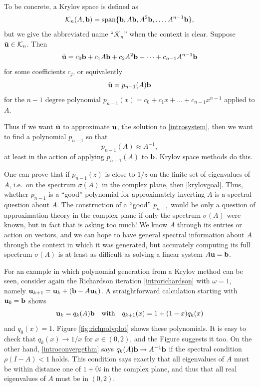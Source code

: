 To be concrete, a Krylov space is defined as
    $$\mathcal{K}_n(A,\mathbf{b}) = \operatorname{span}\{\mathbf{b},A\mathbf{b},A^2\mathbf{b},\dots,A^{n-1}\mathbf{b}\},$$
but we give the abbreviated name ``$\mathcal{K}_n$'' when the context is clear.  Suppose $\tilde{\mathbf{u}} \in \mathcal{K}_n$.  Then
    $$\tilde{\mathbf{u}} = c_0 \mathbf{b} + c_1 A \mathbf{b} + c_2 A^2 \mathbf{b} + \dots + c_{n-1} A^{n-1} \mathbf{b}$$
for some coefficients $c_j$, or equivalently
    $$\tilde{\mathbf{u}} = p_{n-1}(A) \mathbf{b}$$
for the $n-1$ degree polynomial $p_{n-1}(x) = c_0 + c_1 x + \dots + c_{n-1} x^{n-1}$ applied to $A$.

Thus if we want $\tilde{\mathbf{u}}$ to approximate $\mathbf{u}$, the solution to \eqref{introsystem}, then we want to find a polynomial $p_{n-1}$ so that
\begin{equation}
    p_{n-1}(A) \approx A^{-1},  \label{krylovgoal}
\end{equation}
at least in the action of applying $p_{n-1}(A)$ to $\mathbf{b}$.  Krylov space methods do this.

One can prove that if $p_{n-1}(z)$ is close to $1/z$ on the finite set of eigenvalues of $A$, i.e.~on the spectrum $\sigma(A)$ in the complex plane, then \eqref{krylovgoal}.  Thus, whether $p_{n-1}$ is a ``good'' polynomial for approximately inverting $A$ is a spectral question about $A$.  The construction of a ``good'' $p_{n-1}$ would be only a question of approximation theory in the complex plane if only the spectrum $\sigma(A)$ were known, but in fact that is asking too much!  We know $A$ through its entries or action on vectors, and we can hope to have general spectral information about $A$ through the context in which it was generated, but accurately computing its full spectrum $\sigma(A)$ is at least as difficult as solving a linear system $A\mathbf{u}=\mathbf{b}$.

For an example in which polynomial generation from a Krylov method can be seen, consider again the Richardson iteration \eqref{introrichardson} with $\omega=1$, namely $\mathbf{u}_{k+1} = \mathbf{u}_k + (\mathbf{b} - A \mathbf{u}_k)$.  A straightforward calculation starting with $\mathbf{u}_0=\mathbf{b}$ shows
\begin{equation}
	\mathbf{u}_k = q_k(A) \mathbf{b} \quad \text{with} \quad q_{k+1}(x) = 1 + (1-x) q_k(x)  \label{richpolys}
\end{equation}
and $q_0(x)=1$.
Figure \ref{fig:richpolyplot} shows these polynomials.  It is easy to check that $q_k(x) \to 1/x$ for $x\in (0,2)$, and the Figure suggests it too.  On the other hand, \eqref{introconvergethm} says $q_k(A) \mathbf{b} \to A^{-1} \mathbf{b}$ if the spectral condition $\rho(I-A)<1$ holds.  This condition says exactly that all eigenvalues of $A$ must be within distance one of $1+0i$ in the complex plane, and thus that all real eigenvalues of $A$ must be in $(0,2)$.

